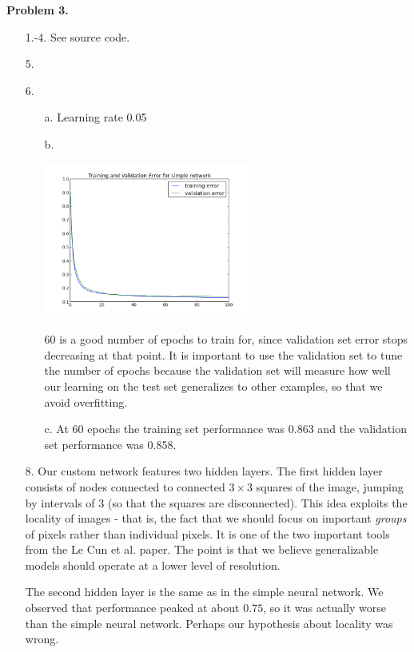 \documentclass[12pt]{amsart}
\theoremstyle{remark}
\begin{document}
\noindent \textbf{Problem 3.}

\begin{itemize}
\item[1.-4.] See source code.

\item[5.]

\item[6.]
\begin{itemize}
\item[a.] Learning rate 0.05
\item[b.] 

\includegraphics[height =2in]{simple100_005}

60 is a good number of epochs to train for, since validation set error stops decreasing at that point. It is important to use the validation set to tune the number of epochs because the validation set will measure how well our learning on the test set generalizes to other examples, so that we avoid overfitting.

\item[c.] At 60 epochs the training set performance was 0.863 and the validation set performance was 0.858.
\end{itemize}

\item[8.] Our custom network features two hidden layers. The first hidden layer consists of nodes connected 
to connected $3 \times 3$ squares of the image, jumping by intervals of $3$ (so that the squares are 
disconnected). This idea exploits the locality of images - that is, the fact that we should focus on important 
\emph{groups} of pixels rather than individual pixels. It is one of the two important tools from the Le Cun et 
al. paper. The point is that we believe generalizable models should operate at a lower level of resolution.

The second hidden layer is the same as in the simple neural network. We observed that performance peaked 
at about $0.75$, so it was actually worse than the simple neural network. Perhaps our hypothesis about 
locality was wrong. 

\end{itemize}
\end{document}

